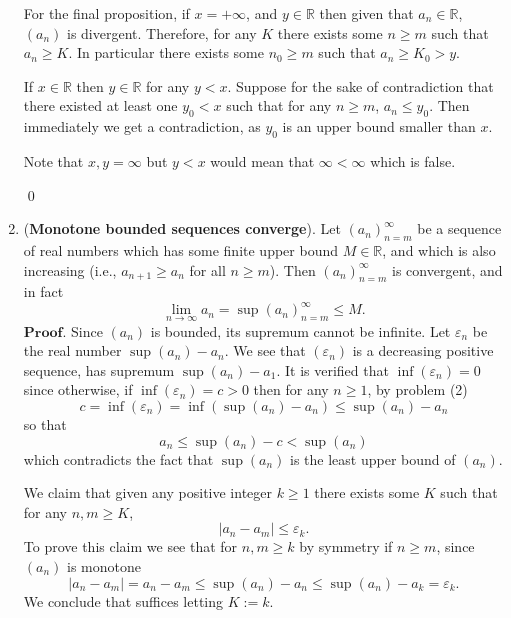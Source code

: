 \documentclass{article}
\theoremstyle{remark}
\begin{document}
\begin{enumerate}
        For the final proposition, if $x = +\infty$, and $y \in \mathbb{R}$ then given that 
        $a_n \in \mathbb{R}$, $(a_n)$ is divergent. 
        Therefore, for any $K$ there exists some $n \geq m$ such that 
        $a_n \geq K$. In particular there exists some $n_0 \geq m$ such that $a_n \geq K_0 > y$.

        If $x \in \mathbb{R}$ then $y \in \mathbb{R}$ for any $y < x$. 
        Suppose for the sake of contradiction that there existed at least one $y_0 < x$ such that for any $n \geq m$, $a_n \leq y_0$.
        Then immediately we get a contradiction, as $y_0$ is an upper bound smaller than $x$.

        Note that $x,y = \infty$ but $y < x$ would mean that $\infty < \infty$ which is false.
        \begin{flushright}
            \qed
        \end{flushright}

        \item (\textbf{Monotone bounded sequences converge}).
        Let \((a_n)_{n=m}^{\infty}\) be a sequence of real numbers which has some finite upper bound \(M \in \mathbb{R}\), and which is also increasing (i.e., \(a_{n+1} \geq a_n\) for all \(n \geq m\)). Then \((a_n)_{n=m}^{\infty}\) is convergent, and in fact
        \[
        \lim_{n \to \infty} a_n = \sup(a_n)_{n=m}^{\infty} \leq M.
        \]
        $\textbf{Proof.}$
        Since $(a_n)$ is bounded, its supremum cannot be infinite.
        Let $\varepsilon_n$ be the real number $\sup(a_n) - a_n$.
        We see that $(\varepsilon_n)$ is a decreasing positive sequence, has supremum $\sup(a_n)-a_1$.
        It is verified that $\inf(\varepsilon_n) = 0$ since otherwise, if $\inf(\varepsilon_n) = c > 0$ then 
        for any $n \geq 1$, by problem (2)
        \[
        c = \inf(\varepsilon_n) = \inf(\sup(a_n) - a_n) \leq \sup(a_n) - a_n 
        \]
        so that
        \[
        a_n \leq \sup(a_n) - c < \sup(a_n)
        \]
        which contradicts the fact that $\sup(a_n)$ is the least upper bound of $(a_n)$.

        We claim that given any positive integer $k \geq 1$ there exists some $K$ such that for any $n,m \geq K$,
        \[
        \vert a_n - a_m \vert \leq \varepsilon_{k}.
        \]
        To prove this claim we see that for $n,m \geq k$ by symmetry if $n \geq m$, since $(a_n)$ is monotone
        \[
        \vert a_n - a_m \vert = a_n - a_m \leq \sup(a_n) - a_n \leq \sup(a_n) - a_k = \varepsilon_k. 
        \]
        We conclude that suffices letting $K := k$.


\end{enumerate}
\end{document}
